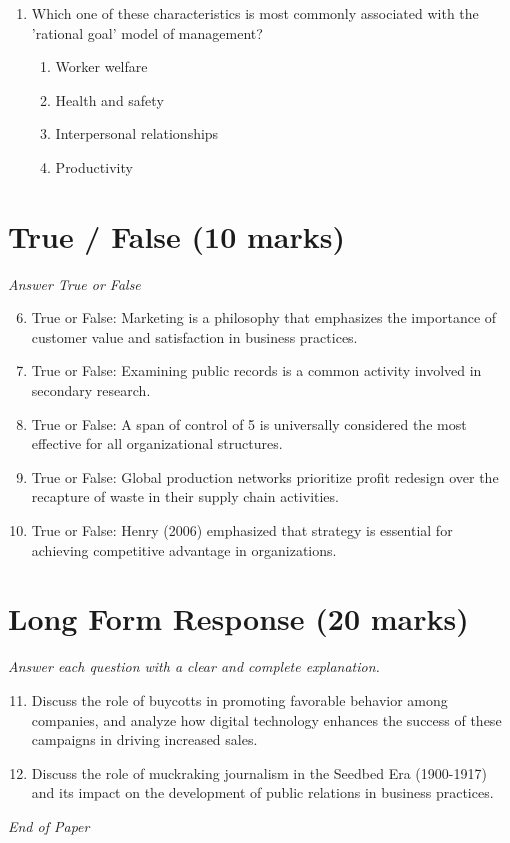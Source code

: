 \documentclass[12pt]{article}
\begin{document}
\begin{enumerate}[label=\arabic*.]
\begin{enumerate}[label=(\alph*)]
    \item Decoding.
    \item Transfer.
    \item Noise.
\end{enumerate}
\item Which one of these characteristics is most commonly associated with the 'rational goal' model of management?
\begin{enumerate}[label=(\alph*)]
    \item Worker welfare
    \item Health and safety
    \item Interpersonal relationships
    \item Productivity
\end{enumerate}
\end{enumerate}

\section*{True / False (10 marks)}
\textit{Answer True or False}
\begin{enumerate}[label=\arabic*.]
\setcounter{enumi}{5}
\item True or False: Marketing is a philosophy that emphasizes the importance of customer value and satisfaction in business practices.
\item True or False: Examining public records is a common activity involved in secondary research.
\item True or False: A span of control of 5 is universally considered the most effective for all organizational structures.
\item True or False: Global production networks prioritize profit redesign over the recapture of waste in their supply chain activities.
\item True or False: Henry (2006) emphasized that strategy is essential for achieving competitive advantage in organizations.
\end{enumerate}

\section*{Long Form Response (20 marks)}
\textit{Answer each question with a clear and complete explanation.}
\begin{enumerate}[label=\arabic*.]
\setcounter{enumi}{10}
\item Discuss the role of buycotts in promoting favorable behavior among companies, and analyze how digital technology enhances the success of these campaigns in driving increased sales.
\item Discuss the role of muckraking journalism in the Seedbed Era (1900-1917) and its impact on the development of public relations in business practices.
\end{enumerate}

\vfill
\noindent\textit{End of Paper}
\end{document}
